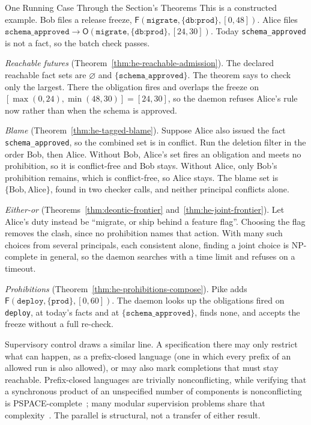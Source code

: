 \begin{pdexample}{One Running Case Through the Section's Theorems}
\setlength{\parskip}{4pt plus 1pt}
This is a constructed example. Bob files a release freeze,
$\mathsf F(\texttt{migrate},\{\texttt{db:prod}\},[0,48])$. Alice files
$\texttt{schema\_approved}\to\mathsf O(\texttt{migrate},\{\texttt{db:prod}\},[24,30])$.
Today \texttt{schema\_approved} is not a fact, so the batch check passes.

\emph{Reachable futures} (Theorem~\ref{thm:he-reachable-admission}). The
declared reachable fact sets are $\varnothing$ and
$\{\texttt{schema\_approved}\}$. The theorem says to check only the largest.
There the obligation fires and overlaps the freeze on
$[\max(0,24),\min(48,30)]=[24,30]$, so the daemon refuses Alice's rule now
rather than when the schema is approved.

\emph{Blame} (Theorem~\ref{thm:he-tagged-blame}). Suppose Alice also issued
the fact \texttt{schema\_approved}, so the combined set is in conflict. Run the
deletion filter in the order Bob, then Alice. Without Bob, Alice's set fires an
obligation and meets no prohibition, so it is conflict-free and Bob stays.
Without Alice, only Bob's prohibition remains, which is conflict-free, so Alice
stays. The blame set is $\{\text{Bob},\text{Alice}\}$, found in two checker
calls, and neither principal conflicts alone.

\emph{Either-or} (Theorems~\ref{thm:deontic-frontier}
and~\ref{thm:he-joint-frontier}). Let Alice's duty instead be ``migrate, or
ship behind a feature flag''. Choosing the flag removes the clash, since no
prohibition names that action. With many such choices from several
principals, each consistent alone, finding a joint choice is NP-complete in
general, so the daemon searches with a time limit and refuses on a timeout.

\emph{Prohibitions} (Theorem~\ref{thm:he-prohibitions-compose}). Pike adds
$\mathsf F(\texttt{deploy},\{\texttt{prod}\},[0,60])$. The daemon looks up the
obligations fired on \texttt{deploy}, at today's facts and at
$\{\texttt{schema\_approved}\}$, finds none, and accepts the freeze without a
full re-check.
\end{pdexample}

Supervisory control draws a similar line. A specification there may only
restrict what can happen, as a prefix-closed language (one in which every
prefix of an allowed run is also allowed), or may also mark completions that
must stay reachable. Prefix-closed languages are trivially
nonconflicting, while verifying that a synchronous product of an unspecified
number of components is nonconflicting is
PSPACE-complete~; many modular supervision
problems share that complexity~. The parallel is
structural, not a transfer of either result.

\pdexercisepointer{\ref{ex:he-blame-order}}{\ref{ex:he-new-direction-check}}{\pageref{ex:he-blame-order}}
